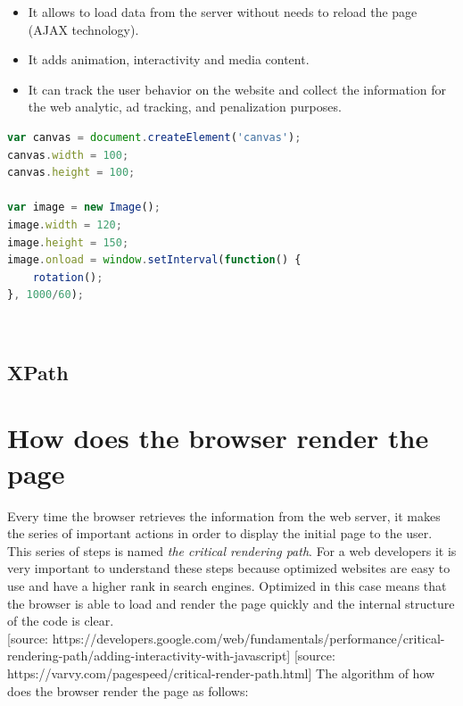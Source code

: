 \begin{itemize}
    \item It allows to load data from the server without needs to reload the page (AJAX technology).
    \item It adds animation, interactivity and media content.
    \item It can track the user behavior on the website and collect the information for the web analytic, ad tracking, and penalization purposes.
\end{itemize}

\begin{lstlisting}[language=JavaScript]
var canvas = document.createElement('canvas');
canvas.width = 100;
canvas.height = 100;

var image = new Image();
image.width = 120;
image.height = 150;
image.onload = window.setInterval(function() {
    rotation();
}, 1000/60);
\end{lstlisting}\\

\subsection{XPath}

\section{How does the browser render the page}

Every time the browser retrieves the information from the web server, it makes the series of important actions in order to display the initial page to the user. This series of steps is named \textit{the critical rendering path}. For a web developers it is very important to understand these steps because optimized websites are easy to use and have a higher rank in search engines. Optimized in this case means that the browser is able to load and render the page quickly and the internal structure of the code is clear.\\

[source: https://developers.google.com/web/fundamentals/performance/critical-rendering-path/adding-interactivity-with-javascript]
[source: https://varvy.com/pagespeed/critical-render-path.html]
The algorithm of how does the browser render the page as follows:

